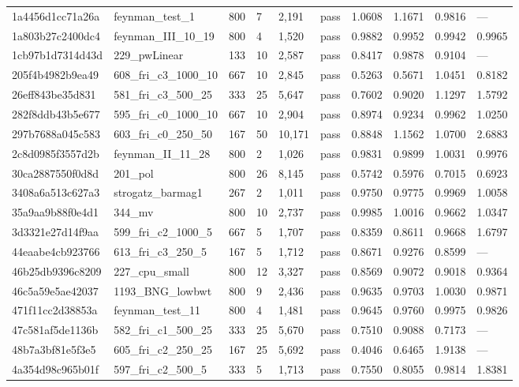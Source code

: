 \begin{longtable}{llllllllll}
1a4456d1cc71a26a & feynman\_test\_1 & 800 & 7 & 2,191 & pass & 1.0608 & 1.1671 & 0.9816 & ---\\
1a803b27c2400dc4 & feynman\_III\_10\_19 & 800 & 4 & 1,520 & pass & 0.9882 & 0.9952 & 0.9942 & 0.9965\\
1cb97b1d7314d43d & 229\_pwLinear & 133 & 10 & 2,587 & pass & 0.8417 & 0.9878 & 0.9104 & ---\\
205f4b4982b9ea49 & 608\_fri\_c3\_1000\_10 & 667 & 10 & 2,845 & pass & 0.5263 & 0.5671 & 1.0451 & 0.8182\\
26eff843be35d831 & 581\_fri\_c3\_500\_25 & 333 & 25 & 5,647 & pass & 0.7602 & 0.9020 & 1.1297 & 1.5792\\
282f8ddb43b5e677 & 595\_fri\_c0\_1000\_10 & 667 & 10 & 2,904 & pass & 0.8974 & 0.9234 & 0.9962 & 1.0250\\
297b7688a045c583 & 603\_fri\_c0\_250\_50 & 167 & 50 & 10,171 & pass & 0.8848 & 1.1562 & 1.0700 & 2.6883\\
2c8d0985f3557d2b & feynman\_II\_11\_28 & 800 & 2 & 1,026 & pass & 0.9831 & 0.9899 & 1.0031 & 0.9976\\
30ca2887550f0d8d & 201\_pol & 800 & 26 & 8,145 & pass & 0.5742 & 0.5976 & 0.7015 & 0.6923\\
3408a6a513c627a3 & strogatz\_barmag1 & 267 & 2 & 1,011 & pass & 0.9750 & 0.9775 & 0.9969 & 1.0058\\
35a9aa9b88f0e4d1 & 344\_mv & 800 & 10 & 2,737 & pass & 0.9985 & 1.0016 & 0.9662 & 1.0347\\
3d3321e27d14f9aa & 599\_fri\_c2\_1000\_5 & 667 & 5 & 1,707 & pass & 0.8359 & 0.8611 & 0.9668 & 1.6797\\
44eaabe4cb923766 & 613\_fri\_c3\_250\_5 & 167 & 5 & 1,712 & pass & 0.8671 & 0.9276 & 0.8599 & ---\\
46b25db9396c8209 & 227\_cpu\_small & 800 & 12 & 3,327 & pass & 0.8569 & 0.9072 & 0.9018 & 0.9364\\
46c5a59e5ae42037 & 1193\_BNG\_lowbwt & 800 & 9 & 2,436 & pass & 0.9635 & 0.9703 & 1.0030 & 0.9871\\
471f11cc2d38853a & feynman\_test\_11 & 800 & 4 & 1,481 & pass & 0.9645 & 0.9760 & 0.9975 & 0.9826\\
47c581af5de1136b & 582\_fri\_c1\_500\_25 & 333 & 25 & 5,670 & pass & 0.7510 & 0.9088 & 0.7173 & ---\\
48b7a3bf81e5f3e5 & 605\_fri\_c2\_250\_25 & 167 & 25 & 5,692 & pass & 0.4046 & 0.6465 & 1.9138 & ---\\
4a354d98c965b01f & 597\_fri\_c2\_500\_5 & 333 & 5 & 1,713 & pass & 0.7550 & 0.8055 & 0.9814 & 1.8381\\

\end{longtable}
